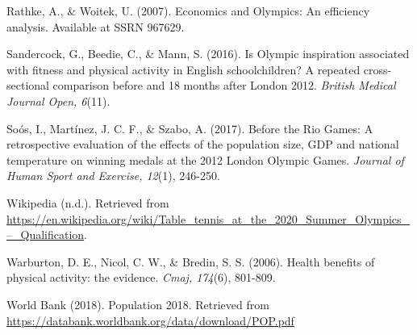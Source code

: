 \documentclass[
]{article}
\begin{document}
Rathke, A., \& Woitek, U. (2007). Economics and Olympics: An efficiency analysis. Available at SSRN 967629.

Sandercock, G., Beedie, C., \& Mann, S. (2016). Is Olympic inspiration associated with fitness and physical activity in English schoolchildren? A repeated cross-sectional comparison before and 18 months after London 2012. \emph{British Medical Journal Open, 6}(11).

Soós, I., Martínez, J. C. F., \& Szabo, A. (2017). Before the Rio Games: A retrospective evaluation of the effects of the population size, GDP and national temperature on winning medals at the 2012 London Olympic Games. \emph{Journal of Human Sport and Exercise, 12}(1), 246-250.

Wikipedia (n.d.). Retrieved from \url{https://en.wikipedia.org/wiki/Table_tennis_at_the_2020_Summer_Olympics_–_Qualification}.

Warburton, D. E., Nicol, C. W., \& Bredin, S. S. (2006). Health benefits of physical activity: the evidence. \emph{Cmaj, 174}(6), 801-809.

World Bank (2018). Population 2018. Retrieved from \url{https://databank.worldbank.org/data/download/POP.pdf}
\end{document}
